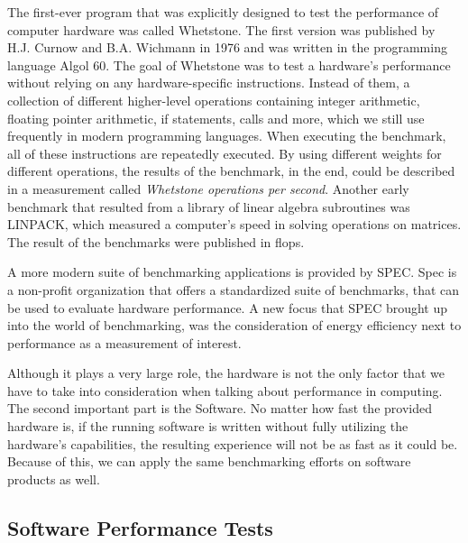 The first-ever program that was explicitly designed to test the performance of
computer hardware was called Whetstone. The first version was published by H.J.
Curnow and B.A. Wichmann in 1976 and was written in the programming language
Algol 60. The goal of Whetstone was to test a hardware's performance without
relying on any hardware-specific instructions. Instead of them, a collection of
different higher-level operations containing integer arithmetic, floating
pointer arithmetic, if statements, calls and more, which we still use frequently
in modern programming languages. When executing the benchmark, all of these
instructions are repeatedly executed. By using different weights for different
operations, the results of the benchmark, in the end, could be described in a
measurement called \emph{Whetstone operations per second}.  Another early
benchmark that resulted from a library of linear algebra subroutines was
LINPACK, which measured a computer's speed in solving operations on matrices. The
result of the benchmarks were published in \gls{flops}.
\cite{OverviewBenchmarks}

A more modern suite of benchmarking applications is provided by SPEC. Spec is a
non-profit organization that offers a standardized suite of benchmarks, that
can be used to evaluate hardware performance. A new focus that SPEC brought up
into the world of benchmarking, was the consideration of energy efficiency next
to performance as a measurement of interest.
\cite{Spec}

Although it plays a very large role, the hardware is not the only factor that we
have to take into consideration when talking about performance in computing. The
second important part is the Software. No matter how fast the provided hardware
is, if the running software is written without fully utilizing the hardware's
capabilities, the resulting experience will not be as fast as it could be.
Because of this, we can apply the same benchmarking efforts on software products
as well.



\subsection{Software Performance Tests}

